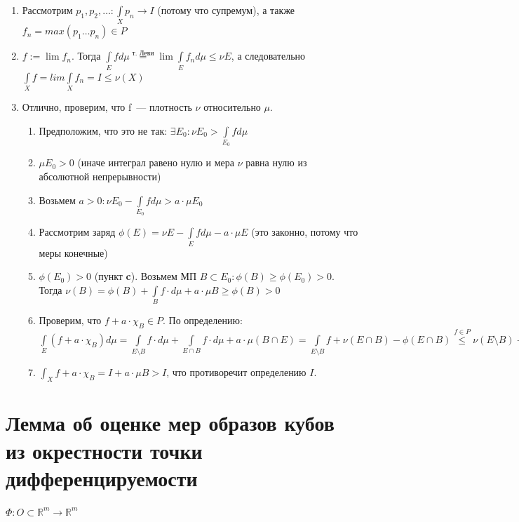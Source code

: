 \documentclass[paper=a4, fontsize=17pt]{article}
\begin{document}
\begin{itemize}
\begin{enumerate}
				$\exists$ последовательсность $f_1 \leq f_2 \leq \dots \in P : \int\limits_X f_n d\mu \rightarrow I$ докажем, что она существует
				\item
				Рассмотрим $p_1, p_2, \dots : \int\limits_X p_n \rightarrow I$ (потому что супремум), а также $f_n = max(p_1 \dots p_n) \in P$
				\item
				$f := \lim f_n$. Тогда $\int\limits_E f d\mu \overset{\text{т. Леви}}{=} \lim \int\limits_E f_n d\mu \leq \nu E$, а следовательно $\int\limits_X f = lim \int\limits_X f_n = I \leq \nu(X)$
				\item
				Отлично, проверим, что f~--- плотность $\nu$ относительно $\mu$.
				\begin{enumerate}
					\item
					Предположим, что это не так: $\exists E_0 : \nu E_0 > \int\limits_{E_0} f d\mu$
					\item
					$\mu E_0 > 0$ (иначе интеграл равено нулю и мера $\nu$ равна нулю из абсолютной непрерывности)
					\item
					Возьмем $a > 0 : \nu E_0 - \int\limits_{E_0} f d\mu > a \cdot \mu E_0$
					\item
					Рассмотрим заряд $\phi(E) = \nu E - \int\limits_E f d\mu - a \cdot \mu E$ (это законно, потому что меры конечные)
					\item
					$\phi(E_0) > 0$ (пункт \textbf{c}). Возьмем МП $B \subset E_0 : \phi(B) \geq \phi(E_0) > 0$. Тогда $\nu(B) = \phi(B) + \int\limits_B f \cdot d\mu + a \cdot \mu B \geq \phi(B) > 0$
					\item
					Проверим, что $f + a \cdot \chi_B \in P$.
                    По определению: $\int\limits_E(f + a \cdot \chi_B)d\mu = \int\limits_{E \setminus B} f \cdot d\mu + \int\limits_{E \cap B} f \cdot d\mu + a \cdot \mu(B \cap E) = \int\limits_{E \setminus B} f + \nu(E \cap B) - \phi (E \cap B) \overset{f \in P}{\leq} \nu(E \setminus B) + \nu(E \cap B) - \phi(E \cap B) = \nu E - \phi(E \cap B) \overset{\phi \geq 0}{\leq} \nu E$
					\item
					$\int_X f + a \cdot \chi_B = I  + a \cdot \mu B > I$, что противоречит определению $I$.
				\end{enumerate}
			\end{enumerate}
		\end{itemize}


\section{Лемма об оценке мер образов кубов из окрестности точки дифференцируемости}
$\Phi: O \subset \mathds{R}^m \rightarrow \mathds{R}^m$
\end{document}
